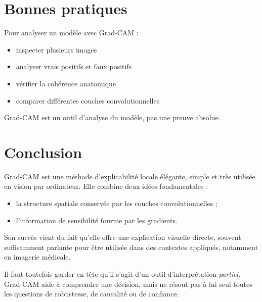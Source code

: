 ﻿\documentclass[11pt,a4paper]{article}
\begin{document}
\section{Bonnes pratiques}

Pour analyser un modèle avec Grad-CAM :

\begin{itemize}

\item inspecter plusieurs images

\item analyser vrais positifs et faux positifs

\item vérifier la cohérence anatomique

\item comparer différentes couches convolutionnelles

\end{itemize}

Grad-CAM est un outil d'analyse du modèle, pas une preuve absolue.


\section{Conclusion}

Grad-CAM est une méthode d'explicabilité locale élégante, simple et très utilisée en vision par ordinateur. Elle combine deux idées fondamentales :
\begin{itemize}
    \item la structure spatiale conservée par les couches convolutionnelles ;
    \item l'information de sensibilité fournie par les gradients.
\end{itemize}

Son succès vient du fait qu'elle offre une explication visuelle directe, souvent suffisamment parlante pour être utilisée dans des contextes appliqués, notamment en imagerie médicale.

Il faut toutefois garder en tête qu'il s'agit d'un outil d'interprétation \emph{partiel}. Grad-CAM aide à comprendre une décision, mais ne résout pas à lui seul toutes les questions de robustesse, de causalité ou de confiance.
\end{document}
